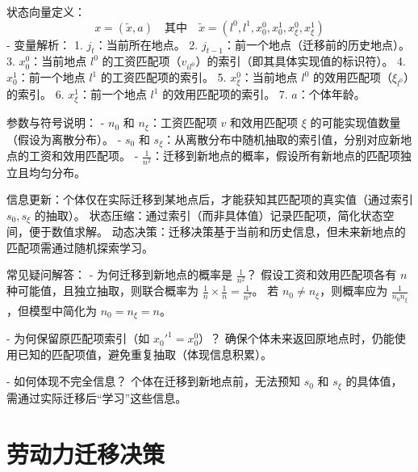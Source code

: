 \documentclass[a4paper,12pt,oneside]{book} %
\begin{document}
状态向量定义：
\[ x = (\tilde{x}, a) \quad \text{其中} \quad \tilde{x} = (l^0, l^1, x_0^0, x_0^1, x_\xi^0, x_\xi^1) \]
- 变量解析：
  1. $j_t$：当前所在地点。
  2. $j_{t-1}$：前一个地点（迁移前的历史地点）。
  3. $x_0^0$：当前地点 $l^0$ 的工资匹配项（$v_{il^0}$）的索引（即其具体实现值的标识符）。
  4. $x_0^1$：前一个地点 $l^1$ 的工资匹配项的索引。
  5. $x_\xi^0$：当前地点 $l^0$ 的效用匹配项（$\xi_{l^0}$）的索引。
  6. $x_\xi^1$：前一个地点 $l^1$ 的效用匹配项的索引。
  7. $a$：个体年龄。


参数与符号说明：
- $n_0$ 和 $n_\xi$：工资匹配项 $v$ 和效用匹配项 $\xi$ 的可能实现值数量（假设为离散分布）。
- $s_0$ 和 $s_\xi$：从离散分布中随机抽取的索引值，分别对应新地点的工资和效用匹配项。
- $\frac{1}{n^2}$：迁移到新地点的概率，假设所有新地点的匹配项独立且均匀分布。


信息更新：个体仅在实际迁移到某地点后，才能获知其匹配项的真实值（通过索引 $s_0, s_\xi$ 的抽取）。
状态压缩：通过索引（而非具体值）记录匹配项，简化状态空间，便于数值求解。
动态决策：迁移决策基于当前和历史信息，但未来新地点的匹配项需通过随机探索学习。


常见疑问解答：
- 为何迁移到新地点的概率是 $\frac{1}{n^2}$？  
  假设工资和效用匹配项各有 $n$ 种可能值，且独立抽取，则联合概率为 $\frac{1}{n} \times \frac{1}{n} = \frac{1}{n^2}$。  
  若 $n_0 \neq n_\xi$，则概率应为 $\frac{1}{n_0 n_\xi}$，但模型中简化为 $n_0 = n_\xi = n$。

- 为何保留原匹配项索引（如 $x_0'^1 = x_0^0$）？  
  确保个体未来返回原地点时，仍能使用已知的匹配项值，避免重复抽取（体现信息积累）。

- 如何体现不完全信息？  
  个体在迁移到新地点前，无法预知 $s_0$ 和 $s_\xi$ 的具体值，需通过实际迁移后“学习”这些信息。













\section{劳动力迁移决策}
\end{document}
